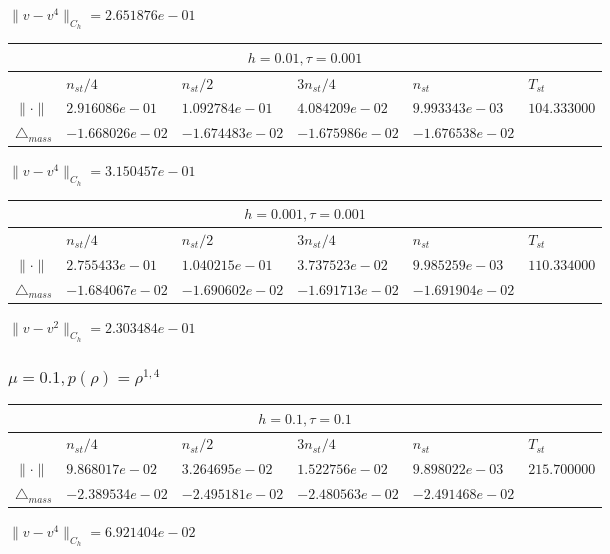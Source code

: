 $\|v-v^{4}\|_{C_h} = 2.651876e-01$

\begin{tabular}{*{6}{|l}|}
    \hline
     \\
    \hline
    &$n_{st}/4 $&$ n_{st}/2$&$3n_{st}/4$&$n_{st}$&$T_{st}$ \\
    \hline
    $\|\cdot \|$& $2.916086e-01$ & $1.092784e-01$ & $4.084209e-02$ & $9.993343e-03$ &$104.333000$\\
\hline
$\triangle_{mass}$& $-1.668026e-02$ & $-1.674483e-02$ & $-1.675986e-02$ & $-1.676538e-02$ &\\
\hline
\end{tabular}

$\|v-v^{4}\|_{C_h} = 3.150457e-01$


\begin{tabular}{*{6}{|l}|}
    \hline
     \\
    \hline
    &$n_{st}/4 $&$ n_{st}/2$&$3n_{st}/4$&$n_{st}$&$T_{st}$ \\
    \hline
$\|\cdot \|$& $2.755433e-01$ & $1.040215e-01$ & $3.737523e-02$ & $9.985259e-03$ &$110.334000$\\
\hline
$\triangle_{mass}$& $-1.684067e-02$ & $-1.690602e-02$ & $-1.691713e-02$ & $-1.691904e-02$ &\\
\hline

\end{tabular}

$\|v-v^{2}\|_{C_h} = 2.303484e-01$

\subsubsection{$\mu = 0.1, p(\rho) = \rho^{1,4} $}

\begin{tabular}{*{6}{|l}|}
    \hline
     \\
    \hline
    &$n_{st}/4 $&$ n_{st}/2$&$3n_{st}/4$&$n_{st}$&$T_{st}$ \\
    \hline
    $\|\cdot \|$& $9.868017e-02$ & $3.264695e-02$ & $1.522756e-02$ & $9.898022e-03$ &$215.700000$\\
\hline
$\triangle_{mass}$& $-2.389534e-02$ & $-2.495181e-02$ & $-2.480563e-02$ & $-2.491468e-02$ &\\
\hline
\end{tabular}

$\|v-v^{4}\|_{C_h} = 6.921404e-02$


